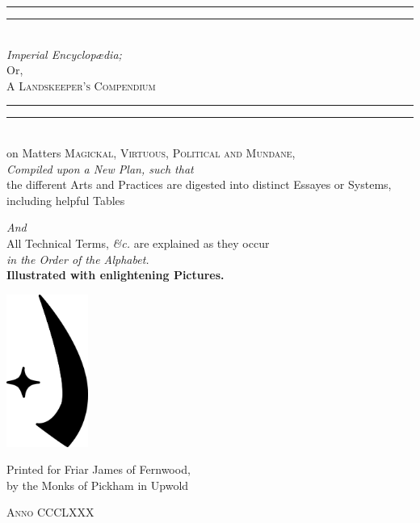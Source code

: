 \documentclass[twoside,fontsize=9pt,a5paper]{scrbook}
\begin{document}
\pagestyle{plain}

\begin{titlepage}
 \centering
 \vspace*{\baselineskip}
 \rule{\textwidth}{1.4pt}\vspace*{-\baselineskip}\vspace*{2pt}
 \rule{\textwidth}{0.3pt}\\[\baselineskip]
 
 {\Huge \itshape Imperial Encyclopædia;}\\[0.4em]
 {\Large Or,\\[0.4em]}
 {\huge\scshape A Landskeeper's Compendium}\\
 \rule{\textwidth}{0.4pt}\vspace*{-\baselineskip}\vspace{3.2pt}
 \rule{\textwidth}{1.6pt}\\[\baselineskip]
 {\Large on Matters \scshape Magickal, Virtuous, Political {\normalfont and} Mundane,\\[0.9em]}
 {\itshape Compiled upon a New Plan, such that\\[0.5em]}
 {\large the different Arts and Practices are digested into distinct Essayes or Systems, including helpful Tables}
 
 {\itshape And\\[0.5em]}
 {\large All Technical Terms, \textit{\&c.} are explained as they occur \\[0.5em] \itshape in the Order of the Alphabet.}
 \\[0.9em]
 {\bfseries Illustrated with enlightening Pictures.}
 
 \vfill
 
 \includegraphics[height=5cm]{encyclopedia/Sular.pdf}

 \vfill

 Printed for Friar James of Fernwood,\\[0.4em]
 by the Monks of Pickham in Upwold
 
 {\scshape Anno CCCLXXX}
\end{titlepage}
\end{document}
